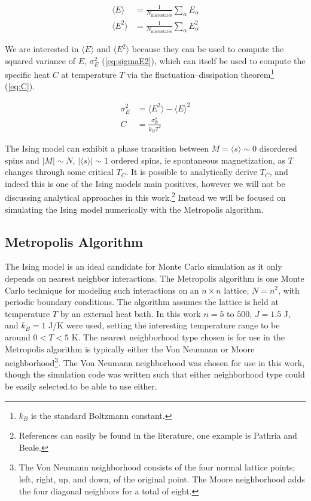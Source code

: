 \documentclass[notitlepage,aps,prd,nofootinbib]{revtex4-1}
\begin{document}
\begin{align}
\langle E \rangle &= \frac{1}{N_{\mathrm{microstates}}} \sum_{\alpha} E_{\alpha} \label{eq:ave_E} \\
\langle E^{2} \rangle &= \frac{1}{N_{\mathrm{microstates}}} \sum_{\alpha} E_{\alpha}^{2} \label{eq:ave_E2}
\end{align}

We are interested in $\langle E \rangle$ and $\langle E^{2} \rangle$ because they can be used to compute the squared variance of $E$, $\sigma_{E}^{2}$ (\ref{eq:sigmaE2}), which can itself be used to compute the specific heat $C$ at temperature $T$ via the fluctuation--dissipation theorem\footnote{$k_{B}$ is the standard Boltzmann constant.} (\ref{eq:C}).

\begin{align}
\sigma_{E}^{2} &=  \langle E^{2} \rangle - \langle E \rangle^{2} \label{eq:sigmaE2} \\
C &= \frac{\sigma_{E}^{2}}{k_{B} T^{2}} \label{eq:C}
\end{align}

The Ising model can exhibit a phase transition between $M=\langle s \rangle \sim 0$ disordered spins and $\left|M\right|\sim N,\,\left|\langle s \rangle\right| \sim 1$ ordered spins, ie spontaneous magnetization, as $T$ changes through some critical $T_{C}$. It is possible to analytically derive $T_{C}$, and indeed this is one of the Ising models main positives, however we will not be discussing analytical approaches in this work.\footnote{References can easily be found in the literature, one example is Pathria and Beale.} Instead we will be focused on simulating the Ising model numerically with the Metropolis algorithm.

\subsection{Metropolis Algorithm}
\label{subsec:met_alg}

The Ising model is an ideal candidate for Monte Carlo simulation as it only depends on nearest neighbor interactions. The Metropolis algorithm is one Monte Carlo technique for modeling such interactions on an $n\times n$ lattice, $N=n^{2}$, with periodic boundary conditions. The algorithm assumes the lattice is held at temperature $T$ by an external heat bath. In this work $n=5$ to $500$, $J=1.5$ J, and $k_{B}=1$ J/K were used, setting the interesting temperature range to be around $0 < T < 5$ K. The nearest neighborhood type chosen is for use in the Metropolis algorithm is typically either the Von Neumann or Moore neighborhood\footnote{The Von Neumann neighborhood consists of the four normal lattice points; left, right, up, and down, of the original point. The Moore neighborhood adds the four diagonal neighbors for a total of eight.}. The Von Neumann neighborhood was chosen for use in this work, though the simulation code was written such that either neighborhood type could be easily selected.to be able to use either.
\end{document}
